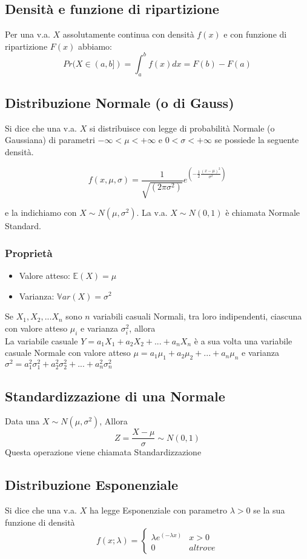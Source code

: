 \documentclass[a4paper]{report}
\begin{document}
  \subsection{Densità e funzione di ripartizione}
  Per una v.a. $X$ assolutamente continua con densità $f(x)$ e con funzione di ripartizione $F(x)$ abbiamo:
  \[ Pr(X \in (a,b]) = \int_{a}^{b} f(x) dx = F(b) - F(a) \]

  \subsection{Distribuzione Normale (o di Gauss)}
  Si dice che una v.a. $X$ si distribuisce con legge di probabilità Normale (o Gaussiana) di parametri $-\infty < \mu < +\infty$ e $ 0 < \sigma < +\infty$ se possiede la seguente densità.

  \[ f(x,\mu,\sigma) = \frac{1}{\sqrt{(2 \pi \sigma^2)}} e^{( -\frac{1}{2} \frac{(x-\mu)^2}{\sigma^2})} \]

  e la indichiamo con $X \sim N(\mu, \sigma^2)$. La v.a. $X \sim N(0,1)$ è chiamata Normale Standard.

  \subsubsection{Proprietà}
  \begin{itemize}
    \item Valore atteso: $\mathbb{E}(X) = \mu$
    \item Varianza: $\mathbb{V}ar(X) = \sigma^2$
  \end{itemize}
  Se $X_1,X_2,...X_n$ sono $n$ variabili casuali Normali, tra loro indipendenti, ciascuna con valore atteso $\mu_i$ e varianza $\sigma^2_i$, allora\\
  La variabile casuale $Y=a_1X_1 + a_2X_2 + ... + a_nX_n$ è a sua volta una variabile casuale Normale con valore atteso $\mu = a_1\mu_1 + a_2\mu_2 + ... + a_n\mu_n$ e varianza $ \sigma^2 = a^2_1\sigma^2_1 + a^2_2\sigma^2_2 + ... + a^2_n\sigma^2_n $

  \subsection{Standardizzazione di una Normale}
  Data una $X \sim N(\mu,\sigma^2)$, Allora
  \[ Z = \frac{X-\mu}{\sigma} \sim N(0,1) \]
  Questa operazione viene chiamata Standardizzazione


  \subsection{Distribuzione Esponenziale}
  Si dice che una v.a. $X$ ha legge Esponenziale con parametro $\lambda >0$ se la sua funzione di densità
  \[
    f(x;\lambda) =
    \begin{cases}
      \lambda e^{(-\lambda x)} & x > 0 \\
      0 & altrove
    \end{cases}
  \]
\end{document}
